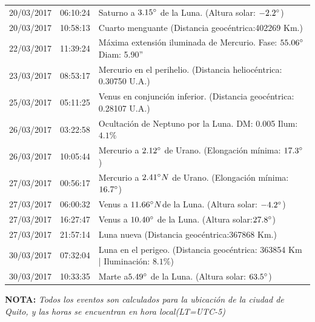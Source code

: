 \documentclass[12pt,a4paper,oneside]{article}
\begin{document}
\begin{center}
\begin{tabular}{ |l| l| l| }
20/03/2017& 06:10:24 &	Saturno a $3.15\degree$ de la Luna. (Altura solar: $-2.2\degree$)	\\
20/03/2017& 10:58:13 &	Cuarto menguante (Distancia geocéntrica:402269 Km.)	\\
22/03/2017& 11:39:24 &	Máxima extensión iluminada de Mercurio. Fase: $55.06\degree$ Diam: 5.90''	\\
23/03/2017& 08:53:17 &	Mercurio en el perihelio. (Distancia heliocéntrica: 0.30750 U.A.)	\\
25/03/2017& 05:11:25 &	Venus en conjunción inferior. (Distancia geocéntrica: 0.28107 U.A.)	\\
26/03/2017& 03:22:58 &	Ocultación de Neptuno por la Luna. DM: 0.005 Ilum: $4.1\%$ \\
26/03/2017& 10:05:44 &	Mercurio a $2.12\degree$ de Urano. (Elongación mínima: $17.3\degree$)	\\
27/03/2017& 00:56:17 &	Mercurio a $2.41\degree N$ de Urano. (Elongación mínima: $16.7\degree  $)	\\
27/03/2017& 06:00:32 &	Venus a $11.66\degree N $de la Luna. (Altura solar: $-4.2\degree$)	\\
27/03/2017& 16:27:47 &	Venus a $10.40\degree$ de la Luna. (Altura solar:$ 27.8\degree$)	\\
27/03/2017& 21:57:14 &	Luna nueva (Distancia geocéntrica:367868 Km.)	\\
30/03/2017& 07:32:04 &	Luna en el perigeo. (Distancia geocéntrica: 363854 Km | Iluminación: $8.1\%$)	\\
30/03/2017& 10:33:35 &	Marte a$ 5.49\degree$ de la Luna. (Altura solar: $63.5\degree$)	\\
\hline
\end{tabular}
\end{center}
\vspace{1cm}
\textbf{NOTA:  }\textit{Todos los eventos son calculados para la ubicaci\'on de la ciudad de Quito, y las horas se encuentran en hora local(LT=UTC-5)}
\vspace{0.7cm}
\newpage
\end{document}
